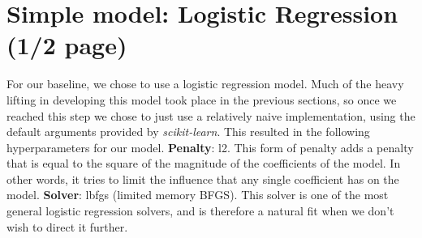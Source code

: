 \section{Simple model: Logistic Regression (1/2 page)} 
For our baseline, we chose to use a logistic regression model. Much of the heavy lifting in developing this model took place in the previous sections,
so once we reached this step we chose to just use a relatively naive implementation, using the default arguments provided
by \textit{scikit-learn}. This resulted in the following hyperparameters for our model. \textbf{Penalty}: l2. This form of penalty adds a penalty that is equal to the square of the magnitude of the
    coefficients of the model. In other words, it tries to limit the influence that any single coefficient has on the
    model. \textbf{Solver}: lbfgs (limited memory BFGS). This solver is one of the most general logistic regression
    solvers, and is therefore a natural fit when we don't wish to direct it further.
